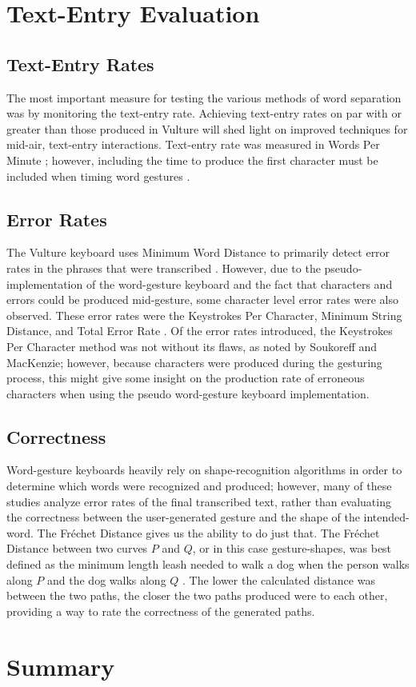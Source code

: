 \section{Text-Entry Evaluation}
\subsection{Text-Entry Rates}
The most important measure for testing the various methods of word separation was by monitoring the text-entry rate. Achieving text-entry rates on par with or greater than those produced in Vulture will shed light on improved techniques for mid-air, text-entry interactions. Text-entry rate was measured in Words Per Minute \cite{ref_wpm_word_gesture_formula}; however, including the time to produce the first character must be included when timing word gestures \cite{ref_wpm_word_gesture_timing}.

\subsection{Error Rates}
The Vulture keyboard uses Minimum Word Distance to primarily detect error rates in the phrases that were transcribed \cite{ref_vulture}. However, due to the pseudo-implementation of the word-gesture keyboard and the fact that characters and errors could be produced mid-gesture, some character level error rates were also observed. These error rates were the Keystrokes Per Character, Minimum String Distance, and Total Error Rate \cite{ref_error_rates}. Of the error rates introduced, the Keystrokes Per Character method was not without its flaws, as noted by Soukoreff and MacKenzie; however, because characters were produced during the gesturing process, this might give some insight on the production rate of erroneous characters when using the pseudo word-gesture keyboard implementation.

\subsection{Correctness}
Word-gesture keyboards heavily rely on shape-recognition algorithms in order to determine which words were recognized and produced; however, many of these studies analyze error rates of the final transcribed text, rather than evaluating the correctness between the user-generated gesture and the shape of the intended-word. The Fr\'echet Distance gives us the ability to do just that. The Fr\'echet Distance between two curves $P$ and $Q$, or in this case gesture-shapes, was best defined as the minimum length leash needed to walk a dog when the person walks along $P$ and the dog walks along $Q$ \cite{ref_frechet}. The lower the calculated distance was between the two paths, the closer the two paths produced were to each other, providing a way to rate the correctness of the generated paths.

\section{Summary}
